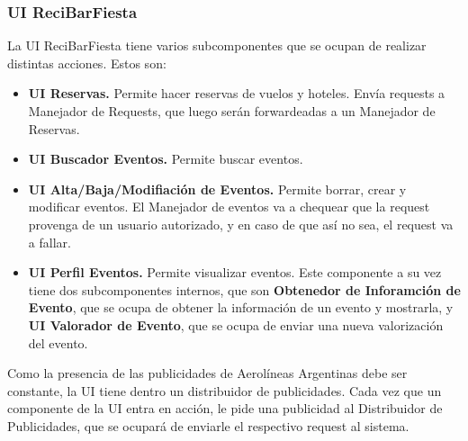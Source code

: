 \subsubsection{UI ReciBarFiesta}

La UI ReciBarFiesta tiene varios subcomponentes que se ocupan de realizar distintas acciones. Estos son:

\begin{itemize}

  \item \textbf{UI Reservas.} Permite hacer reservas de vuelos y hoteles. Envía requests a Manejador de Requests, que luego serán forwardeadas a un Manejador de Reservas.
  \item \textbf{UI Buscador Eventos.} Permite buscar eventos.
  \item \textbf{UI Alta/Baja/Modifiación de Eventos.} Permite borrar, crear y modificar eventos. El Manejador de eventos va a chequear que la request provenga de un usuario autorizado, y en caso de que así no sea, el request va a fallar.
  \item \textbf{UI Perfil Eventos.} Permite visualizar eventos. Este componente a su vez tiene dos subcomponentes internos, que son \textbf{Obtenedor de Inforamción de Evento}, que se ocupa de obtener la información de un evento y mostrarla, y \textbf{UI Valorador de Evento}, que se ocupa de enviar una nueva valorización del evento.
\end{itemize}

Como la presencia de las publicidades de Aerolíneas Argentinas debe ser constante, la UI tiene dentro un distribuidor de publicidades. Cada vez que un componente de la UI entra en acción, le pide una publicidad al Distribuidor de Publicidades, que se ocupará de enviarle el respectivo request al sistema.



